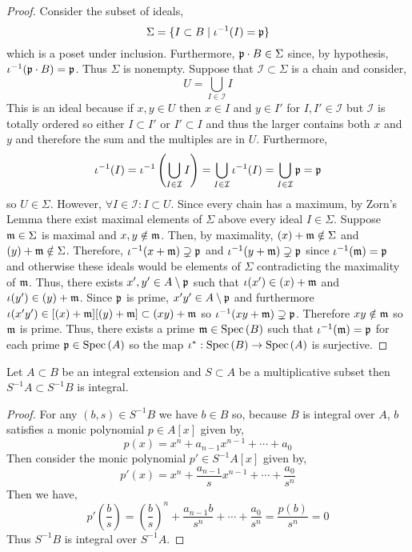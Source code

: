 \documentclass[12pt]{extarticle}
\begin{document}
\begin{proof}
Consider the subset of ideals,
\[ \Sigma = \{ I \subset B \mid \iota^{-1}(I) = \mathfrak{p} \} \]
which is a poset under inclusion. Furthermore, $\mathfrak{p} \cdot B \in \Sigma$ since, by hypothesis, $\iota^{-1}(\mathfrak{p} \cdot B) = \mathfrak{p}$. Thus $\Sigma$ is nonempty. Suppose that $\mathcal{I} \subset \Sigma$ is a chain and consider,
\[ U = \bigcup_{I \in \mathcal{I}} I \]
This is an ideal because if $x, y \in U$ then $x \in I$ and $y \in I'$ for $I, I' \in \mathcal{I}$ but $\mathcal{I}$ is totally ordered so either $I \subset I'$ or $I' \subset I$ and thus the larger contains both $x$ and $y$ and therefore the sum and the multiples are in $U$. 
Furthermore,
\[ \iota^{-1}(I) = \iota^{-1} \left( \bigcup_{I \in \mathcal{I}} I \right) = \bigcup_{I \in \mathcal{I}} \iota^{-1}(I) = \bigcup_{I \in \mathcal{I}} \mathfrak{p} = \mathfrak{p} \]
so $U \in \Sigma$. However, $\forall I \in \mathcal{I} : I \subset U$. Since every chain has a maximum, by Zorn's Lemma there exist maximal elements of $\Sigma$ above every ideal $I \in \Sigma$. Suppose $\mathfrak{m} \in \Sigma$ is maximal and $x,y \notin \mathfrak{m}$. Then, by maximality, $(x) + \mathfrak{m} \notin \Sigma$ and $(y) + \mathfrak{m} \notin \Sigma$. Therefore, $\iota^{-1}(x + \mathfrak{m}) \supsetneq \mathfrak{p}$ and $\iota^{-1}(y + \mathfrak{m}) \supsetneq \mathfrak{p}$ since $\iota^{-1}(\mathfrak{m}) = \mathfrak{p}$ and otherwise these ideals would be elements of $\Sigma$ contradicting the maximality of $\mathfrak{m}$. Thus, there exists $x', y' \in A \setminus \mathfrak{p}$ such that $\iota(x') \in (x) + \mathfrak{m}$ and $\iota(y') \in (y) + \mathfrak{m}$. Since $\mathfrak{p}$ is prime, $x'y' \in A \setminus \mathfrak{p}$ and furthermore $\iota(x'y') \in [(x) + \mathfrak{m}][(y) + \mathfrak{m}] \subset (xy) + \mathfrak{m}$ so $\iota^{-1}(xy + \mathfrak{m}) \supsetneq \mathfrak{p}$. Therefore $xy \notin \mathfrak{m}$ so $\mathfrak{m}$ is prime. Thus, there exists a prime $\mathfrak{m} \in \mathrm{Spec}\left( B \right)$ such that $\iota^{-1}(\mathfrak{m}) = \mathfrak{p}$ for each prime $\mathfrak{p} \in \mathrm{Spec}\left( A \right)$ so the map $\iota^* : \mathrm{Spec}\left( B \right) \to \mathrm{Spec}\left( A \right)$ is surjective. 
\end{proof}

\begin{lemma}
Let $A \subset B$ be an integral extension and $S \subset A$ be a multiplicative subset then $S^{-1} A \subset S^{-1} B$ is integral. 
\end{lemma}

\begin{proof}
For any $(b, s) \in S^{-1} B$ we have $b \in B$ so, because $B$ is integral over $A$, $b$ satisfies a monic polynomial $p \in A[x]$
given by,
\[ p(x) = x^n + a_{n-1} x^{n-1} + \cdots + a_0 \]
Then consider the monic polynomial $p' \in S^{-1}A[x]$ given by,
\[ p'(x) = x^n + \frac{a_{n-1}}{s} x^{n-1} + \cdots + \frac{a_0}{s^n} \]
Then we have,
\[ p'\left( \frac{b}{s} \right) = \left( \frac{b}{s} \right)^n + \frac{a_{n-1} b}{s^n} + \cdots + \frac{a_0}{s^n} = \frac{p(b)}{s^n} = 0 \]
Thus $S^{-1} B$ is integral over $S^{-1} A$.  
\end{proof}
\end{document}
